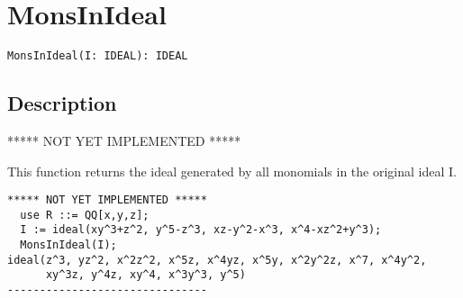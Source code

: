 \documentclass[a4paper]{mybook}
\newenvironment{command}{}{} %
\begin{document}
\section{MonsInIdeal}
\label{MonsInIdeal}
\begin{command} %


\begin{Verbatim}[label=syntax, rulecolor=\color{MidnightBlue},
frame=single]
MonsInIdeal(I: IDEAL): IDEAL
\end{Verbatim}


\subsection*{Description}

***** NOT YET IMPLEMENTED *****
\par 
This function returns the ideal generated by all monomials in the
original ideal I.
\begin{Verbatim}[label=example, rulecolor=\color{PineGreen}, frame=single]
***** NOT YET IMPLEMENTED *****
  use R ::= QQ[x,y,z];
  I := ideal(xy^3+z^2, y^5-z^3, xz-y^2-x^3, x^4-xz^2+y^3);
  MonsInIdeal(I);
ideal(z^3, yz^2, x^2z^2, x^5z, x^4yz, x^5y, x^2y^2z, x^7, x^4y^2,
      xy^3z, y^4z, xy^4, x^3y^3, y^5)
-------------------------------
\end{Verbatim}


\end{command} %
\end{document}
